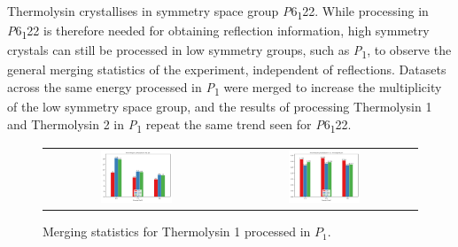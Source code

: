 Thermolysin crystallises in symmetry space group \textit{P}6\textsubscript{1}22. While processing in \textit{P}6\textsubscript{1}22 is therefore needed for obtaining reflection information, high symmetry crystals can still be processed in low symmetry groups, such as \textit{P}\textsubscript{1}, to observe the general merging statistics of the experiment, independent of reflections.
Datasets across the same energy processed in \textit{P}\textsubscript{1} were merged to increase the multiplicity of the low symmetry space group, and the results of processing Thermolysin 1 and Thermolysin 2 in \textit{P}\textsubscript{1} repeat the same trend seen for \textit{P}6\textsubscript{1}22.

\begin{figure}[h]
    \centering
    \begin{tabular}{cc}
    \includegraphics[width = 0.4\textwidth]{plots/exp1/tlys_9_P1/I_over_sigma.png} & \includegraphics[width = 0.4\textwidth]{plots/exp1/tlys_9_P1/rmerges.png}
    \end{tabular}
    \caption{Merging statistics for Thermolysin 1 processed in $P_1$.}
    \label{fig:tlys_9_p1}
\end{figure}

